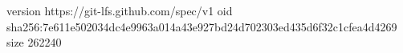 version https://git-lfs.github.com/spec/v1
oid sha256:7e611e502034dc4e9963a014a43e927bd24d702303ed435d6f32c1cfea4d4269
size 262240
